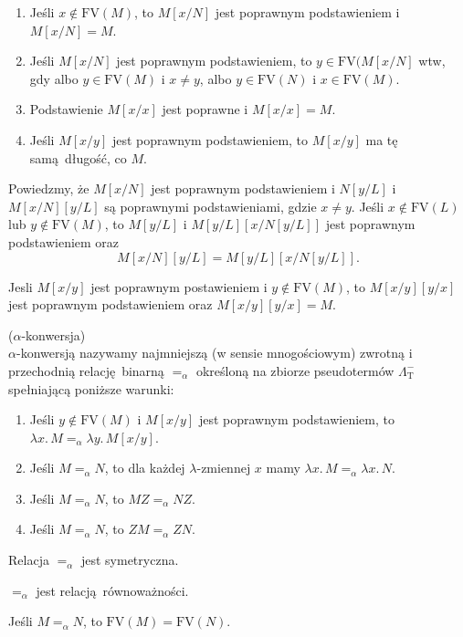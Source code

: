     \begin{fakt}
      \begin{enumerate}[label=({\alph*})]
        \item Jeśli \(x\not\in\mathrm{FV}(M)\), to \(M[x/N]\) jest poprawnym podstawieniem i \(M[x/N]=M\).
        \item Jeśli \(M[x/N]\) jest poprawnym podstawieniem, to \(y\in\mathrm{FV}(M[x/N]\) wtw, gdy albo \(y\in\mathrm{FV}(M)\)
          i \(x\neq y\), albo \(y\in \mathrm{FV}(N)\) i \(x\in \mathrm{FV}(M)\). 
        \item Podstawienie \(M[x/x]\) jest poprawne i \(M[x/x]=M\).
        \item Jeśli \(M[x/y]\) jest poprawnym podstawieniem, to \(M[x/y]\) ma tę samą długość, co \(M\).
      \end{enumerate}
    \end{fakt}
    \begin{fakt}
      Powiedzmy, że \(M[x/N]\) jest poprawnym podstawieniem i \(N[y/L]\) i \(M[x/N][y/L]\) są poprawnymi podstawieniami, gdzie
      \(x\neq y\). Jeśli \(x\not\in \mathrm{FV}(L)\) lub \(y\not\in\mathrm{FV}(M)\), to \(M[y/L]\) i \( M[y/L]\left[x/N[y/L]\right] \) jest poprawnym podstawieniem oraz
      \[
        M[x/N][y/L]=M[y/L][x/N[y/L]].
      \]
    \end{fakt}

    \begin{fakt}
      Jesli \(M[x/y]\) jest poprawnym postawieniem i \(y\not\in\mathrm{FV}(M)\), to \(M[x/y][y/x]\) jest poprawnym podstawieniem oraz
      \(M[x/y][y/x]=M\).
    \end{fakt}
    
  \begin{definicja}(\(\alpha\)-konwersja)\\
    \(\alpha\)-konwersją nazywamy najmniejszą (w sensie mnogościowym) zwrotną i przechodnią relację binarną \(=_\alpha\) określoną na zbiorze pseudotermów \(\Lambda^{-}_{\mathrm{T}}\) spełniającą poniższe warunki:
    \begin{enumerate}[label=({\alph*})]
      \item Jeśli \(y\not\in \mathrm{FV}(M)\) i \(M[x/y]\) jest poprawnym podstawieniem, to \(\lambda x.\, M  =_\alpha \lambda y.\, M[x/y]\).
      \item Jeśli \(M=_\alpha N\), to dla każdej \(\lambda\)-zmiennej \(x\) mamy \(\lambda x.\, M =_\alpha \lambda x.\,N\).
      \item Jeśli \(M=_\alpha N\), to \(M Z=_\alpha N Z\).
      \item Jeśli \(M=_\alpha N\), to \(ZM =_\alpha ZN\).
    \end{enumerate}
  \end{definicja}
    \begin{fakt}
      Relacja \(=_{\alpha}\) jest symetryczna.
    \end{fakt}
    \begin{fakt}
      \(=_{\alpha}\) jest relacją równoważności.
    \end{fakt}
    \begin{fakt}
      Jeśli \(M=_\alpha N\), to \(\mathrm{FV}(M)=\mathrm{FV}(N)\).
    \end{fakt}


